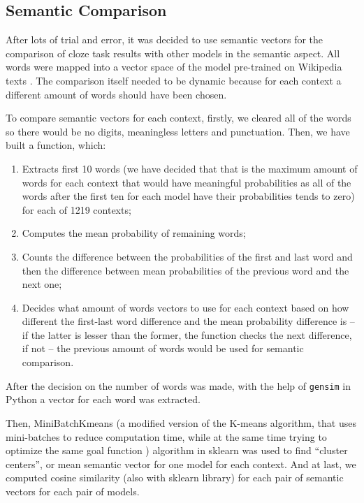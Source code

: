 \documentclass[a4paper]{article}
\begin{document}
\subsection{Semantic Comparison}

After lots of trial and error, it was decided to use semantic vectors for the comparison of cloze task results with other models in the semantic aspect. All words were mapped into a vector space of the model pre-trained on Wikipedia texts \cite{arefyev}. The comparison itself needed to be dynamic because for each context a different amount of words should have been chosen.

To compare semantic vectors for each context, firstly, we cleared all of the words so there would be no digits, meaningless letters and punctuation. Then, we have built a function, which:

\begin{enumerate}[1)]
\item Extracts first 10 words (we have decided that that is the maximum amount of words for each context that would have meaningful probabilities as all of the words after the first ten for each model have their probabilities tends to zero) for each of 1219 contexts;
\item Computes the mean probability of remaining words; 
\item Counts the difference between the probabilities of the first and last word and then the difference between mean probabilities of the previous word and the next one;
\item Decides what amount of words vectors to use for each context based on how different the first-last word difference and the mean probability difference is – if the latter is lesser than the former, the function checks the next difference, if not – the previous amount of words would be used for semantic comparison.
\end{enumerate}

After the decision on the number of words was made, with the help of \texttt{gensim} in Python a vector for each word was extracted.

Then, MiniBatchKmeans (a modified version of the K-means algorithm, that uses mini-batches to reduce computation time, while at the same time trying to optimize the same goal function \cite{bejar}) algorithm in sklearn was used to find “cluster centers”, or mean semantic vector for one model for each context. And at last, we computed cosine similarity (also with sklearn library) for each pair of semantic vectors for each pair of models.
\end{document}
